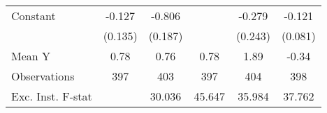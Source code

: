 {\begin{tabular}{l*{5}{c}}
\addlinespace
Constant            &      -0.127         &      -0.806\sym{***}&                     &      -0.279         &      -0.121         \\
                    &     (0.135)         &     (0.187)         &                     &     (0.243)         &     (0.081)         \\
\midrule
Mean Y              &        0.78         &        0.76         &        0.78         &        1.89         &       -0.34         \\
Observations        &         397         &         403         &         397         &         404         &         398         \\
Exc. Inst. F-stat   &                     &      30.036         &      45.647         &      35.984         &      37.762         \\
\bottomrule
\end{tabular}
}
